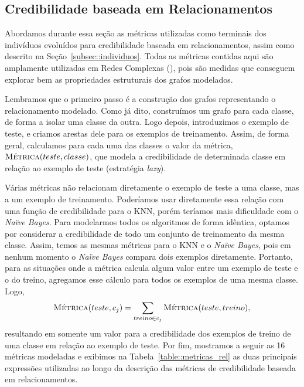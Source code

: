 
\subsection{Credibilidade baseada em Relacionamentos}
\label{sec::pg_cred_baseada_grafos}

Abordamos durante essa seção as métricas utilizadas como terminais dos indivíduos evoluídos para credibilidade baseada em relacionamentos, assim como descrito na Seção~\ref{subsec::individuos}. Todas as métricas contidas aqui são amplamente utilizadas em Redes Complexas (\cite{Newman03}), pois são medidas que conseguem explorar bem as propriedades estruturais dos grafos modelados.

Lembramos que o primeiro passo é a construção dos grafos representando o relacionamento modelado.
Como já dito, construímos um grafo para cada classe, de forma a isolar uma classe da outra.
Logo depois, introduzimos o exemplo de teste, e criamos arestas dele para os exemplos de treinamento. Assim, de forma geral, calculamos para cada uma das classes o valor da métrica, $\textsc{Métrica}(teste, classe)$, que modela a credibilidade de determinada classe em relação ao exemplo de teste (estratégia \emph{lazy}).

Várias métricas não relacionam diretamente o exemplo de teste a uma classe, mas a um exemplo de treinamento.
Poderíamos usar diretamente essa relação com uma função de credibilidade para o \textsc{KNN}, porém teríamos mais dificuldade com o \textit{Naïve Bayes}. Para modelarmos todos os algoritmos de forma idêntica, optamos por considerar a credibilidade de todo um conjunto de treinamento da mesma classe. Assim, temos as mesmas métricas para o \textsc{KNN} e o \textit{Naïve Bayes}, pois em nenhum momento o \textit{Naïve Bayes} compara dois exemplos diretamente.
Portanto, para as situações onde a métrica calcula algum valor entre um exemplo de teste e o do treino, agregamos esse cálculo para todos os exemplos de uma mesma classe. Logo,
\begin{equation}
         \textsc{Métrica}(teste, c_j) =  \sum\limits_{treino \in c_j} \textsc{Métrica}(teste, treino),
\end{equation}
resultando em somente um valor para a credibilidade dos exemplos de treino de uma classe em relação ao exemplo de teste.
Por fim, mostramos a seguir as 16 métricas modeladas e exibimos na Tabela~\ref{table::metricas_rel} as duas principais expressões utilizadas ao longo da descrição das métricas de credibilidade baseada em relacionamentos.

